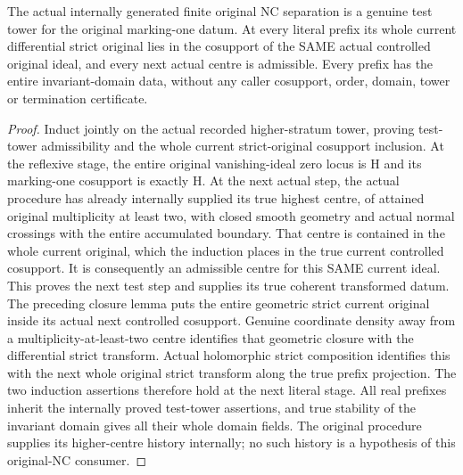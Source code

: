 \begin{theorem}
\label{hir:general-nc-internal-original-test-tower}
\leanok
The actual internally generated finite original NC separation is a genuine
test tower for the original marking-one datum. At every literal prefix its
whole current differential strict original lies in the cosupport of the SAME
actual controlled original ideal, and every next actual centre is admissible.
Every prefix has the entire invariant-domain data, without any caller
cosupport, order, domain, tower or termination certificate.
\end{theorem}
\begin{proof}
Induct jointly on the actual recorded higher-stratum tower, proving test-tower
admissibility and the whole current strict-original cosupport inclusion. At
the reflexive stage, the entire original vanishing-ideal zero locus is H and
its marking-one cosupport is exactly H. At the next actual step, the actual
procedure has already internally supplied its true highest centre, of attained
original multiplicity at least two, with closed smooth geometry and actual
normal crossings with the entire accumulated boundary. That centre is contained
in the whole current original, which the induction places in the true current
controlled cosupport. It is consequently an admissible centre for this SAME
current ideal. This proves the next test step and supplies its true coherent
transformed datum. The preceding closure lemma puts the entire geometric
strict current original inside its actual next controlled cosupport. Genuine
coordinate density away from a multiplicity-at-least-two centre identifies
that geometric closure with the differential strict transform. Actual
holomorphic strict composition identifies this with the next whole original
strict transform along the true prefix projection. The two induction assertions
therefore hold at the next literal stage. All real prefixes inherit the
internally proved test-tower assertions, and true stability of the invariant
domain gives all their whole domain fields. The original procedure supplies its
higher-centre history internally; no such history is a hypothesis of this
original-NC consumer.
\end{proof}

